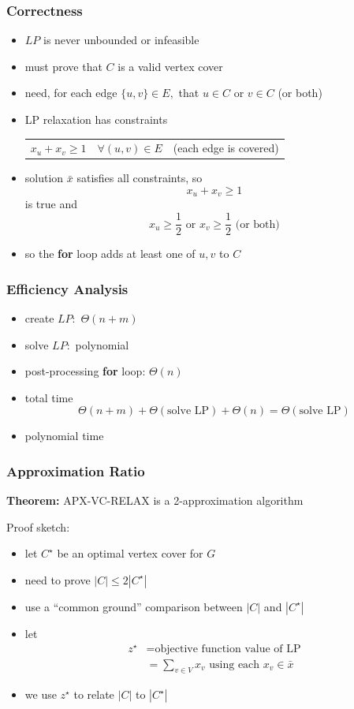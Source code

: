 \documentclass{beamer}
\begin{document}
\begin{frame} \frametitle{Correctness}
\begin{itemize}
  \item $LP$ is never unbounded or infeasible
  \item must prove that $C$ is a valid vertex cover
  \item need, for each edge $\{u, v\} \in E,$ that $u \in C$ or $v \in C$ (or both)
  \item LP relaxation has constraints
    \begin{tabular}{lll}
      $x_u + x_v \geq 1$ & $\forall (u, v) \in E$ & (each edge is covered)
    \end{tabular}
  \item solution $\bar{x}$ satisfies all constraints, so
    \[  x_u + x_v \geq 1 \]
    is true and
    \[ x_u \geq \frac{1}{2} \text{ or } x_v \geq \frac{1}{2} \text{ (or both)}\]
  \item so the \textbf{for} loop adds at least one of $u, v$ to $C$
\end{itemize}
\end{frame}

\begin{frame} \frametitle{Efficiency Analysis}
  \begin{itemize}
    \item create $LP:$ $\Theta(n+m)$
    \item solve $LP:$ polynomial
    \item post-processing \textbf{for} loop: $\Theta(n)$
    \item total time
      \[ \Theta(n+m) + \Theta(\text{solve LP}) + \Theta(n) = \Theta(\text{solve LP}) \]
    \item polynomial time
  \end{itemize}
\end{frame}

\begin{frame} \frametitle{Approximation Ratio}
  \textbf{Theorem:} APX-VC-RELAX is a 2-approximation algorithm

  Proof sketch:
  \begin{itemize}
    \item let $C^\star$ be an optimal vertex cover for $G$
    \item need to prove $|C| \leq 2 |C^\star|$
    \item use a ``common ground'' comparison between $|C|$ and $|C^\star|$
    \item let
      \begin{align*}
        z^\star &= \text{objective function value of LP} \\
        &= \sum_{v \in V} x_v \text{ using each } x_v \in \bar{x}
      \end{align*}
    \item we use $z^\star$ to relate $|C|$ to $|C^\star|$
  \end{itemize}
\end{frame}
\end{document}
